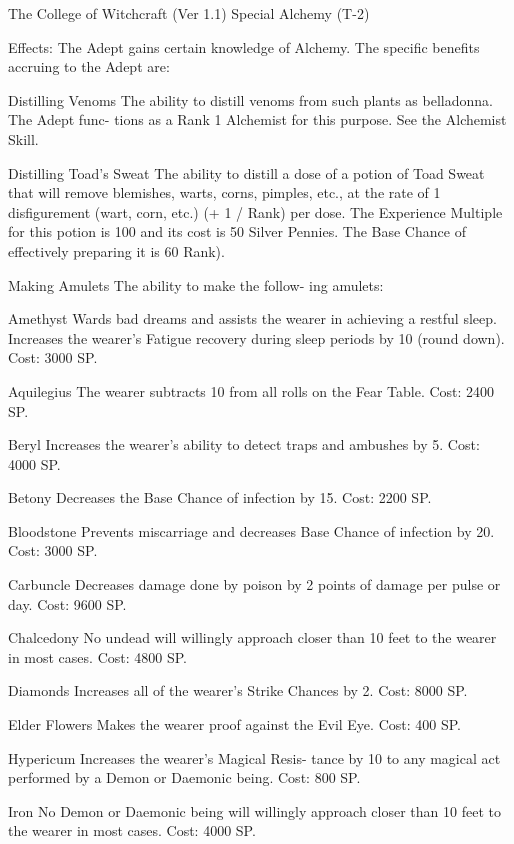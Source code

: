 \begin{Chapter}{The College of Witchcraft (Ver 1.1)}
Special Alchemy (T-2) 

Effects:  The  Adept  gains  certain  knowledge  of 
Alchemy.  The  specific  benefits  accruing  to  the 
Adept are: 

Distilling  Venoms  The  ability  to  distill  venoms 
from  such  plants  as  belladonna.  The  Adept  func-
tions  as  a  Rank  1  Alchemist  for  this  purpose.  See 
the Alchemist Skill. 

Distilling  Toad’s  Sweat  The  ability  to  distill  a 
dose  of  a  potion  of  Toad  Sweat  that  will  remove 
blemishes, warts, corns, pimples, etc., at the rate of 
1  disfigurement  (wart,  corn,  etc.)  (+ 1  / Rank)  per 
dose.  The  Experience  Multiple  for  this  potion  is 
100  and  its  cost  is  50  Silver  Pennies.  The  Base 
Chance  of  effectively  preparing  it  is  60%
Rank). 

Making  Amulets  The  ability  to  make  the  follow-
ing amulets: 

Amethyst Wards bad dreams and assists the wearer 
in achieving a restful sleep.  Increases the wearer’s 
Fatigue  recovery  during  sleep  periods  by  10%
(round down). Cost: 3000 SP. 

Aquilegius  The  wearer  subtracts  10  from  all  rolls 
on the Fear Table. Cost: 2400 SP. 

Beryl  Increases  the  wearer’s  ability  to  detect  traps 
and ambushes by 5. Cost: 4000 SP. 

Betony Decreases the Base Chance of infection by 
15. Cost: 2200 SP. 

Bloodstone  Prevents  miscarriage  and  decreases 
Base Chance of infection by 20. Cost: 3000 SP. 

Carbuncle Decreases damage done by poison by 2 
points of damage per pulse or day. Cost: 9600 SP. 

Chalcedony  No  undead  will  willingly  approach 
closer  than  10  feet  to  the  wearer  in  most  cases. 
Cost: 4800 SP. 

Diamonds  Increases  all  of  the  wearer’s  Strike 
Chances by 2. Cost: 8000 SP. 

Elder Flowers Makes the wearer proof against the 
Evil Eye. Cost: 400 SP. 

Hypericum  Increases  the  wearer’s  Magical  Resis-
tance  by  10  to  any  magical  act  performed  by  a 
Demon or Daemonic being. Cost: 800 SP. 

Iron  No  Demon  or  Daemonic  being will  willingly 
approach closer than 10 feet to the wearer in most 
cases. Cost: 4000 SP. 


\end{Chapter}
